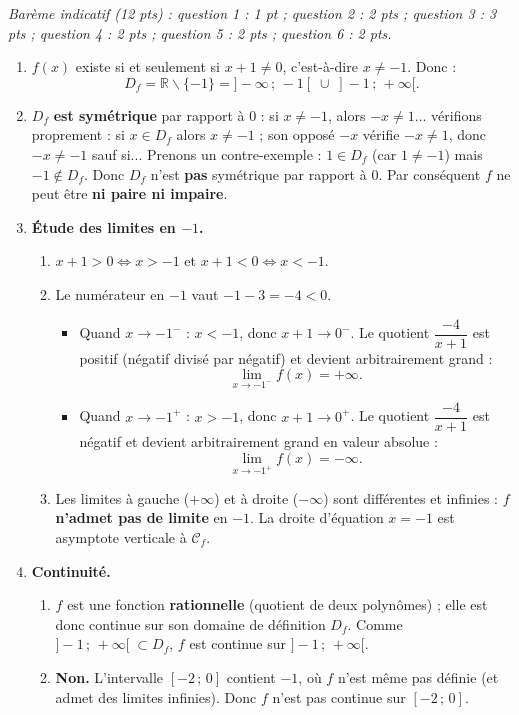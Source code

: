 \documentclass[11pt]{article}
\def\setminus{\mathbin{\backslash}}\let\smallsetminus\setminus
\begin{document}
\begin{corrige}
\emph{Barème indicatif (12 pts) : question 1 : 1 pt ; question 2 : 2 pts ; question 3 : 3 pts ; question 4 : 2 pts ; question 5 : 2 pts ; question 6 : 2 pts.}
\begin{enumerate}
\item $f(x)$ existe si et seulement si $x+1\neq 0$, c'est-à-dire $x\neq -1$. Donc :
\[ D_f=\mathbb{R}\setminus\{-1\}=]-\infty\,;\,-1[\;\cup\;]-1\,;\,+\infty[. \]
\item $D_f$ \textbf{est symétrique} par rapport à $0$ : si $x\neq -1$, alors $-x\neq 1$... vérifions proprement : si $x\in D_f$ alors $x\neq -1$ ; son opposé $-x$ vérifie $-x\neq 1$, donc $-x\neq -1$ sauf si... Prenons un contre-exemple : $1\in D_f$ (car $1\neq -1$) mais $-1\notin D_f$. Donc $D_f$ n'est \textbf{pas} symétrique par rapport à $0$. Par conséquent $f$ ne peut être \textbf{ni paire ni impaire}.
\item \textbf{Étude des limites en $-1$.}
\begin{enumerate}
\item $x+1>0 \iff x>-1$ et $x+1<0 \iff x<-1$.
\item Le numérateur en $-1$ vaut $-1-3=-4<0$.
\begin{itemize}
\item Quand $x\to -1^-$ : $x<-1$, donc $x+1\to 0^-$. Le quotient $\dfrac{-4}{x+1}$ est positif (négatif divisé par négatif) et devient arbitrairement grand :
\[ \lim_{x\to -1^-}f(x)=+\infty. \]
\item Quand $x\to -1^+$ : $x>-1$, donc $x+1\to 0^+$. Le quotient $\dfrac{-4}{x+1}$ est négatif et devient arbitrairement grand en valeur absolue :
\[ \lim_{x\to -1^+}f(x)=-\infty. \]
\end{itemize}
\item Les limites à gauche ($+\infty$) et à droite ($-\infty$) sont différentes et infinies : $f$ \textbf{n'admet pas de limite} en $-1$. La droite d'équation $x=-1$ est asymptote verticale à $\mathcal{C}_f$.
\end{enumerate}
\item \textbf{Continuité.}
\begin{enumerate}
\item $f$ est une fonction \textbf{rationnelle} (quotient de deux polynômes) ; elle est donc continue sur son domaine de définition $D_f$. Comme $]-1\,;\,+\infty[\;\subset D_f$, $f$ est continue sur $]-1\,;\,+\infty[$.
\item \textbf{Non.} L'intervalle $[-2\,;\,0]$ contient $-1$, où $f$ n'est même pas définie (et admet des limites infinies). Donc $f$ n'est pas continue sur $[-2\,;\,0]$.

\end{enumerate}
\end{enumerate}
\end{corrige}
\end{document}
